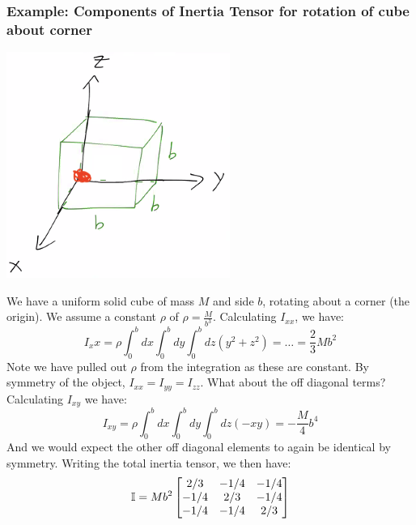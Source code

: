 \subsubsection{Example: Components of Inertia Tensor for rotation of cube about corner}
\begin{center}
    \includegraphics[scale=1]{Lecture-18/l18-img3.png}
\end{center}
We have a uniform solid cube of mass $M$ and side $b$, rotating about a corner (the origin). We assume a constant $\rho$ of $\rho = \frac{M}{b^3}$. Calculating $I_{xx}$, we have:
\[I_xx = \rho\int_0^bdx \int_0^bdy \int_0^bdz (y^2 + z^2) = \ldots = \frac{2}{3}Mb^2\]
Note we have pulled out $\rho$ from the integration as these are constant. By symmetry of the object, $I_{xx} = I_{yy} = I_{zz}$. What about the off diagonal terms? Calculating $I_{xy}$ we have:
\[I_{xy} = \rho\int_0^bdx\int_0^bdy\int_0^bdz(-xy) = -\frac{M}{4}b^4\]
And we would expect the other off diagonal elements to again be identical by symmetry. Writing the total inertia tensor, we then have:
\[\mathbb{I} = Mb^2\begin{bmatrix}2/3 & -1/4 & -1/4 \\ -1/4 & 2/3 & -1/4 \\ -1/4 & -1/4 & 2/3\end{bmatrix}\]

